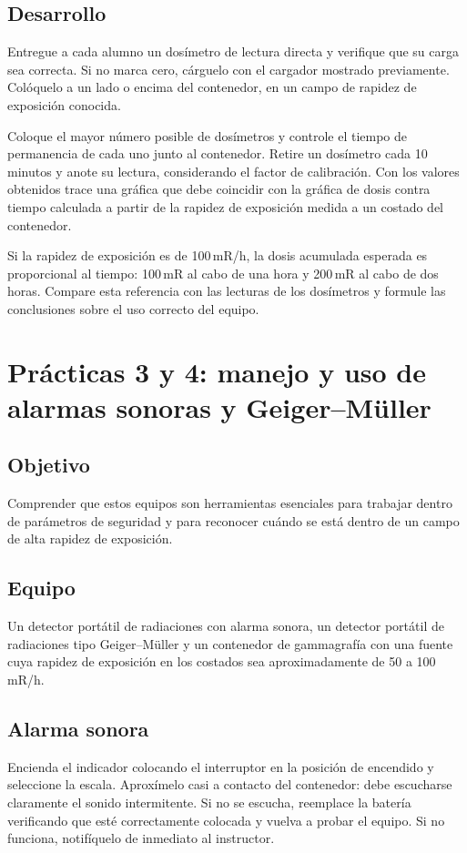 \subsection*{Desarrollo}
Entregue a cada alumno un dosímetro de lectura directa y verifique que su carga sea correcta. Si no marca cero, cárguelo con el cargador mostrado previamente. Colóquelo a un lado o encima del contenedor, en un campo de rapidez de exposición conocida.

Coloque el mayor número posible de dosímetros y controle el tiempo de permanencia de cada uno junto al contenedor. Retire un dosímetro cada 10 minutos y anote su lectura, considerando el factor de calibración. Con los valores obtenidos trace una gráfica que debe coincidir con la gráfica de dosis contra tiempo calculada a partir de la rapidez de exposición medida a un costado del contenedor.

Si la rapidez de exposición es de 100\,mR/h, la dosis acumulada esperada es proporcional al tiempo: 100\,mR al cabo de una hora y 200\,mR al cabo de dos horas. Compare esta referencia con las lecturas de los dosímetros y formule las conclusiones sobre el uso correcto del equipo.

\section{Prácticas 3 y 4: manejo y uso de alarmas sonoras y Geiger--Müller}

\subsection*{Objetivo}
Comprender que estos equipos son herramientas esenciales para trabajar dentro de parámetros de seguridad y para reconocer cuándo se está dentro de un campo de alta rapidez de exposición.

\subsection*{Equipo}
Un detector portátil de radiaciones con alarma sonora, un detector portátil de radiaciones tipo Geiger--Müller y un contenedor de gammagrafía con una fuente cuya rapidez de exposición en los costados sea aproximadamente de 50 a 100\,mR/h.

\subsection*{Alarma sonora}
Encienda el indicador colocando el interruptor en la posición de encendido y seleccione la escala. Aproxímelo casi a contacto del contenedor: debe escucharse claramente el sonido intermitente. Si no se escucha, reemplace la batería verificando que esté correctamente colocada y vuelva a probar el equipo. Si no funciona, notifíquelo de inmediato al instructor.

